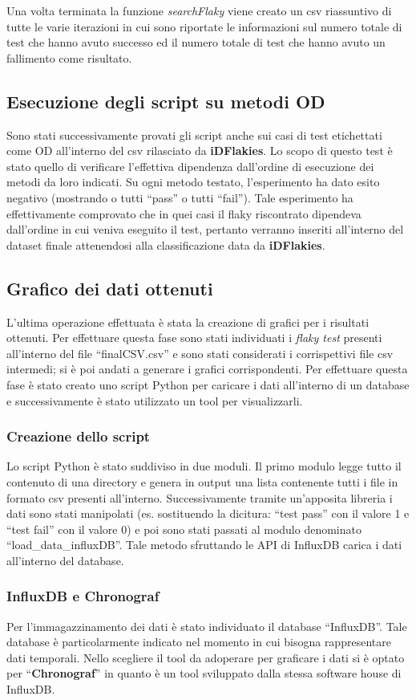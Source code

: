 Una volta terminata la funzione \emph{searchFlaky} viene creato un csv riassuntivo di tutte le varie iterazioni in cui sono riportate le informazioni sul numero totale di test che hanno avuto successo ed il numero totale di test che hanno avuto un fallimento come risultato.
\subsection{Esecuzione degli script su metodi OD}
Sono stati successivamente provati gli script anche sui casi di test etichettati come OD all’interno del csv rilasciato da \textbf{iDFlakies}. Lo scopo di questo test è stato quello di verificare l’effettiva dipendenza dall’ordine di esecuzione dei metodi da loro indicati. Su ogni metodo testato, l’esperimento ha dato esito negativo
(mostrando o tutti “pass” o tutti “fail”). Tale esperimento ha effettivamente comprovato che in quei casi il flaky riscontrato dipendeva dall’ordine in cui veniva eseguito il test, pertanto verranno inseriti all’interno del dataset finale attenendosi
alla classificazione data da \textbf{iDFlakies}.
\subsection{Grafico dei dati ottenuti}
L’ultima operazione effettuata è stata la creazione di grafici per i risultati ottenuti. Per effettuare questa fase sono stati individuati i \emph{flaky test} presenti all’interno del file “finalCSV.csv” e sono stati considerati i corrispettivi file csv
intermedi; si è poi andati a generare i grafici corrispondenti. Per effettuare questa fase è stato creato uno script Python per caricare i dati all’interno di un database e successivamente è stato utilizzato un tool per visualizzarli.
\subsubsection{Creazione dello script}
Lo script Python è stato suddiviso in due moduli. Il primo modulo legge tutto
il contenuto di una directory e genera in output una lista contenente tutti i file in formato csv presenti all’interno. Successivamente tramite un’apposita libreria i dati
sono stati manipolati (es. sostituendo la dicitura: “test pass” con il valore 1 e “test fail” con il valore 0) e poi sono stati passati al modulo denominato “load\_data\_influxDB”. Tale metodo sfruttando le API di InfluxDB carica i dati all’interno del database.
\subsubsection{InfluxDB e Chronograf}
Per l'immagazzinamento dei dati è stato individuato il database “InfluxDB”. Tale database è particolarmente indicato nel momento in cui bisogna rappresentare dati temporali. Nello scegliere il tool da adoperare per graficare i dati
si è optato per “\textbf{Chronograf}” in quanto è un tool sviluppato dalla stessa software
house di InfluxDB.

